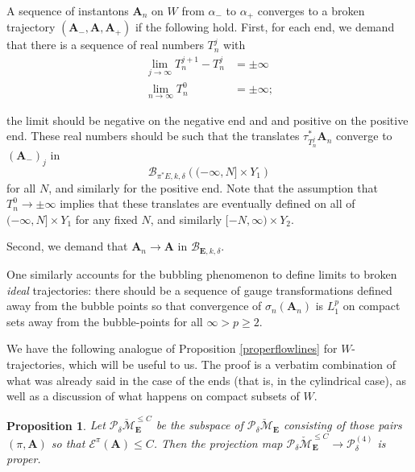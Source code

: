 \documentclass[10pt,a4paper]{amsart}
\newcommand{\pE}{\pi^* \! E}
\newtheorem{proposition}[theorem]{Proposition}
\theoremstyle{definition}
\theoremstyle{remark}
\numberwithin{figure}{qchap}
\begin{document}
A sequence of instantons $\mathbf{A}_n$ on $W$ from $\alpha_-$ to $\alpha_+$ converges to a broken trajectory $(\mathbf{A}_-, \mathbf{A}, \mathbf{A}_+)$ if the following hold. First, for each end, we demand that there is a sequence of real numbers $T_n^j$ with 
\begin{align*}
\lim_{j \to \infty} T_n^{j+1} - T_n^j &= \pm \infty \\
\lim_{n \to \infty} T_n^0 &= \pm \infty;
\end{align*}

the limit should be negative on the negative end and and positive on the positive end. These real numbers should be such that the translates $\tau_{T_n^j}^* \mathbf{A}_n$ converge to $(\mathbf{A}_-)_j$ in 
$$\mathcal B_{\pE,k,\delta}\left((-\infty, N] \times Y_1\right)$$ 
for all $N$, and similarly for the positive end. Note that the assumption that $T_n^0 \to \pm \infty$ implies that these translates are eventually defined on all of $(-\infty, N] \times Y_1$ for any fixed $N$, and similarly $[-N, \infty) \times Y_2$. 

Second, we demand that $\mathbf{A}_n \to \mathbf{A}$ in $\mathcal B_{\mathbf{E},k,\delta}$. 

One similarly accounts for the bubbling phenomenon to define limits to broken \textit{ideal} trajectories: there should be a sequence of gauge transformations defined away from the bubble points so that convergence of $\sigma_n(\mathbf{A}_n)$ is $L^p_1$ on compact sets away from the bubble-points for all $\infty > p \geq 2$. 

We have the following analogue of Proposition \ref{properflowlines} for $W$-trajectories, which will be useful to us. The proof is a verbatim combination of what was already said in the case of the ends (that is, in the cylindrical case), as well as a discussion of what happens on compact subsets of $W$.

\begin{proposition}\label{propertrajectories}Let $\mathcal P_{\delta} \check{\mathcal M}_{\mathbf{E}}^{\leq C}$ be the subspace of $\mathcal P_{\delta} \check{\mathcal M}_{\mathbf{E}}$ consisting of those pairs $(\pi, \mathbf{A})$ so that $\mathcal E^\pi(\mathbf{A}) \leq C$. Then the projection map $\mathcal P_{\delta} \check{\mathcal M}_{\mathbf{E}}^{\leq C} \to \mathcal P^{(4)}_{\delta}$ is proper.\end{proposition}
\end{document}
